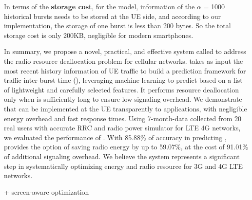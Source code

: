 In terms of the {\bf storage cost}, for the \MostRecent model, information of the $\alpha$ = 1000 historical bursts needs to be stored at the UE side, and according to our implementation, the storage of one burst is less than 200 bytes. So the total storage cost is only 200KB, negligible for modern smartphones.


In summary, we propose a novel, practical, and effective system called \NAMEFULL to address the radio resource deallocation problem for cellular networks. \NAME takes as input the most recent history information of UE traffic to build a prediction framework for traffic inter-burst time (\IBT), leveraging machine learning to predict \IBT based on a list of lightweight and carefully selected features. It performs resource deallocation only when \IBT is sufficiently long to ensure low signaling overhead. We demonstrate that \NAME can be implemented at the UE transparently to applications, with negligible energy overhead and fast response times. Using 7-month-data collected from 20 real users with accurate RRC and radio power simulator for LTE 4G networks, we evaluated the performance of \NAME. With 85.88\% of accuracy in predicting \IBTS, \NAME provides the option of saving radio energy by up to 59.07\%, at the cost of 91.01\% of additional signaling overhead. We believe the \NAME system represents a significant step in systematically optimizing energy and radio resource for 3G and 4G LTE networks.



	+ screen-aware optimization
